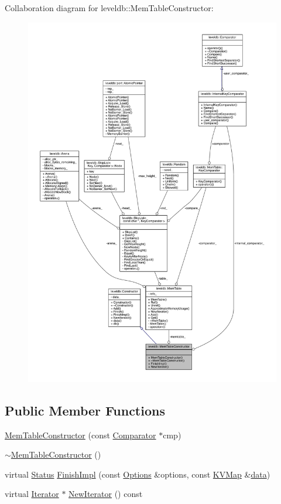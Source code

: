 Collaboration diagram for leveldb\+:\+:Mem\+Table\+Constructor\+:\nopagebreak
\begin{figure}[H]
\begin{center}
\leavevmode
\includegraphics[width=350pt]{classleveldb_1_1_mem_table_constructor__coll__graph}
\end{center}
\end{figure}
\subsection*{Public Member Functions}
\begin{DoxyCompactItemize}
\item 
\hyperlink{classleveldb_1_1_mem_table_constructor_a5f4c341eb97e6e3938ec05b98455664a}{Mem\+Table\+Constructor} (const \hyperlink{structleveldb_1_1_comparator}{Comparator} $\ast$cmp)
\item 
\hyperlink{classleveldb_1_1_mem_table_constructor_a893a3f902a8dbbe7c2548c3ab46512c1}{$\sim$\+Mem\+Table\+Constructor} ()
\item 
virtual \hyperlink{classleveldb_1_1_status}{Status} \hyperlink{classleveldb_1_1_mem_table_constructor_a78851e48bd187f231934e128ab050624}{Finish\+Impl} (const \hyperlink{structleveldb_1_1_options}{Options} \&options, const \hyperlink{namespaceleveldb_aac1e50450147be263e08252c6700f7a7}{K\+V\+Map} \&\hyperlink{classleveldb_1_1_constructor_a55a0363200d6e86d8beb3b15b75e3824}{data})
\item 
virtual \hyperlink{classleveldb_1_1_iterator}{Iterator} $\ast$ \hyperlink{classleveldb_1_1_mem_table_constructor_ae6eca097713c07eed6f630cca780fedd}{New\+Iterator} () const 
\end{DoxyCompactItemize}
